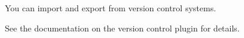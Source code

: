 You can import and export \gdprojects{} from version control systems. 

See the documentation on the version control plugin for details. 


